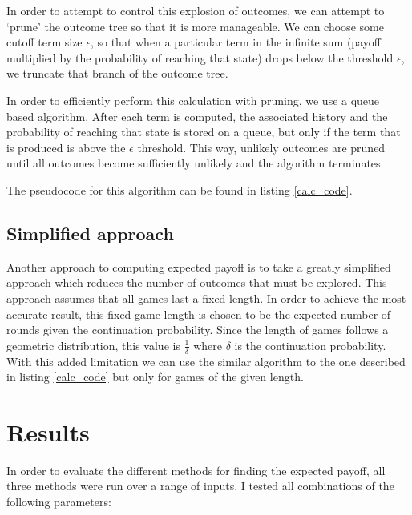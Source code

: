 \documentclass[a4paper,12pt]{article}
\begin{document}
In order to attempt to control this explosion of outcomes, we can attempt to `prune' the outcome tree so that it is more manageable.
We can choose some cutoff term size $\epsilon$, so that when a particular term in the infinite sum (payoff multiplied by the probability of reaching that state) drops below the threshold $\epsilon$, we truncate that branch of the outcome tree.

In order to efficiently perform this calculation with pruning, we use a queue based algorithm.
After each term is computed, the associated history and the probability of reaching that state is stored on a queue, but only if the term that is produced is above the $\epsilon$ threshold.
This way, unlikely outcomes are pruned until all outcomes become sufficiently unlikely and the algorithm terminates.

The pseudocode for this algorithm can be found in listing \ref{calc_code}.



\subsection{Simplified approach}

Another approach to computing expected payoff is to take a greatly simplified approach which reduces the number of outcomes that must be explored.
This approach assumes that all games last a fixed length.
In order to achieve the most accurate result, this fixed game length is chosen to be the expected number of rounds given the continuation probability.
Since the length of games follows a geometric distribution, this value is $\frac{1}{\delta}$ where $\delta$ is the continuation probability.
With this added limitation we can use the similar algorithm to the one described in listing \ref{calc_code} but only for games of the given length.

\clearpage

\section{Results}

In order to evaluate the different methods for finding the expected payoff, all three methods were run over a range of inputs.
I tested all combinations of the following parameters:
\end{document}
